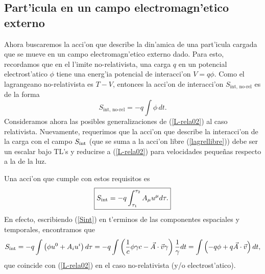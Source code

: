 \subsection{Part'icula en un campo electromagn'etico externo}

Ahora buscaremos la acci'on que describe la din'amica de una part'icula cargada
que se mueve en un campo electromagn'etico externo dado. Para esto, recordamos
que en el l'imite no-relativista, una carga $q$ en un potencial electrost'atico
$\phi$ tiene una energ'ia potencial de interacci'on $V=q\phi$. Como el
lagrangeano no-relativista es $T-V$, entonces la acci'on de interacci'on $S_\text{int, no-rel}$ es de la forma
\begin{equation}
S_\text{int, no-rel}= -q\int \phi\, dt. \label{L-rela02}
\end{equation}
Consideramos ahora las posibles generalizaciones de (\ref{L-rela02}) al caso
relativista. Nuevamente, requerimos que la acci'on que describe la interacci'on
de la carga con el campo $S_{\rm int}$ (que se suma a la acci'on libre
(\ref{lagrellibre})) debe ser un escalar bajo TL's y reducirse a
(\ref{L-rela02}) para velocidades peque\~nas respecto a la de la luz.

Una acci'on que cumple con estos requisitos es
\begin{equation}
\boxed{S_{\rm int}=-q\int_{\tau_1}^{\tau_2}A_\mu u^\mu d\tau.}
\label{Sint}
\end{equation}
En efecto, escribiendo (\ref{Sint}) en t'erminos de las componentes espaciales y
temporales, encontramos que
\begin{equation}
S_{\rm int}=-q\int\left(  \phi u^0+A_i u^i\right)
d\tau=-q\int \left(\frac{1}{c}\phi \gamma c-\vec{A}\cdot\vec{v}\gamma \right)
\frac{1}{\gamma}dt =\int \left(-q\phi+q\vec{A}\cdot\vec{v}\right) dt ,
\label{L-rela03b}
\end{equation}
que coincide con (\ref{L-rela02}) en el caso no-relativista (y/o
electrost'atico).

